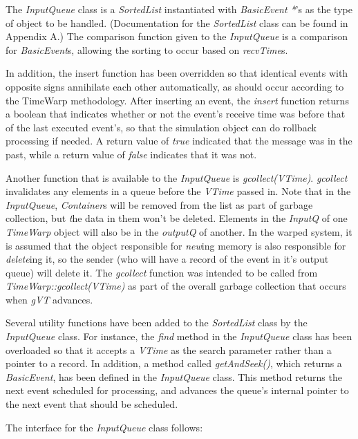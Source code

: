 \documentclass[11pt]{report}
\begin{document}
The {\it InputQueue} class is a {\it SortedList} instantiated with {\it
BasicEvent *}'s as the type of object to be handled. (Documentation for
the {\it SortedList} class can be found in Appendix A.) The comparison
function given to the {\it InputQueue} is a comparison for {\it
BasicEvent}s, allowing the sorting to occur based on {\it recvTime}s.

In addition, the insert function has been overridden so that identical
events with opposite signs annihilate each other automatically, as should
occur according to the TimeWarp methodology.  After inserting an event,
the {\it insert} function returns a boolean that indicates whether or not
the event's receive time was before that of the last executed event's, so
that the simulation object can do rollback processing if needed.  A return
value of {\it true} indicated that the message was in the past, while a
return value of {\it false} indicates that it was not.

Another function that is available to the {\it InputQueue} is {\it
gcollect(VTime)}.  {\it gcollect} invalidates any elements in a queue
before the {\it VTime} passed in.  Note that in the {\it InputQueue}, {\it
Container}s will be removed from the list as part of garbage collection,
but {\emph the data in them won't be deleted}.  Elements in the {\it
InputQ} of one {\it TimeWarp} object will also be in the {\it outputQ} of
another.  In the {\sc warped} system, it is assumed that the object
responsible for {\it new}ing memory is also responsible for {\it
delete}ing it, so the sender (who will have a record of the event in it's
output queue) will delete it.  The {\it gcollect} function was intended to
be called from {\it TimeWarp::gcollect(VTime)} as part of the overall
garbage collection that occurs when {\it gVT} advances.

Several utility functions have been added to the {\it SortedList} class by
the {\it InputQueue} class. For instance, the {\it find} method in the
{\it InputQueue} class has been overloaded so that it accepts a {\it
VTime} as the search parameter rather than a pointer to a record.  In
addition, a method called {\it getAndSeek()}, which returns a {\it
BasicEvent}, has been defined in the {\it InputQueue} class.  This method
returns the next event scheduled for processing, and advances the queue's
internal pointer to the next event that should be scheduled.

The interface for the {\it InputQueue} class follows:
\end{document}
